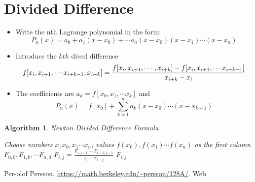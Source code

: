 \documentclass[12pt]{article}
\newtheorem{alg}[theorem]{Algorithm}
\begin{document}
\section{Divided Difference}
\begin{itemize}
	\item Write the nth Lagrange polynomial in the form: 
	$$P_n(x) = a_0 +a_1(x - x_0) +\cdots a_n(x - x_0)(x - x_1) \cdots (x-x_n)$$
	\item Introduce the $kth$ dived difference
	$$
		f[x_i, x_{i+1}, \cdots x_{i+k-1}, x_{i+k}]  =  \\
		\frac{f[x_i, x_{i+1}, \cdots, x_{i+k}] - f[x_i, x_{i+1}, \cdots x_{i+k-1}]}{x_{i+k} - x_i}
	$$
	\item The coefficients are $a_k = f[x_0,x_1, \cdots x_k]$ and 
	$$P_n(x) = f[x_0] + \sum_{k=1}^{n}a_k(x - x_0) \cdots (x - x_{k-1})$$
\end{itemize}
\begin{alg}{Newton Divided Difference Formula}
\begin{algorithmic}
Choose numbers $x,x_0,x_1 \cdots x_n$; values $f(x_0), f(x_1) \cdots f(x_n)$ as the first column $F_{0,0}, F_{1,0}, \cdots F_{n,0}$ 
\State $F_{i,j} = \frac{F_{i,j-1} -F_{i-1,j-1}}{x_i - x_{i-j}}$
\EndFor
\EndFor
\State \Return $F_{i,j}$
\end{algorithmic}


\end{alg}






 \newpage
 \begin{thebibliography}{1}

      Per-olof Persson, \url{https://math.berkeley.edu/~persson/128A/}. Web

  \end{thebibliography}
\end{document}
